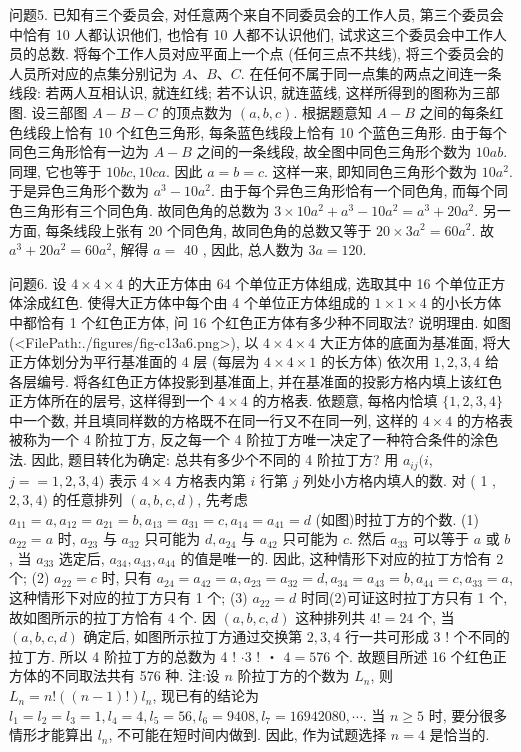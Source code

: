 问题5. 已知有三个委员会, 对任意两个来自不同委员会的工作人员, 第三个委员会中恰有 10 人都认识他们, 也恰有 10 人都不认识他们, 试求这三个委员会中工作人员的总数.
将每个工作人员对应平面上一个点 (任何三点不共线), 将三个委员会的人员所对应的点集分别记为 $A 、 B 、 C$. 在任何不属于同一点集的两点之间连一条线段: 若两人互相认识, 就连红线; 若不认识, 就连蓝线, 这样所得到的图称为三部图.
设三部图 $A-B-C$ 的顶点数为 $(a, b, c)$. 根据题意知 $A-B$ 之间的每条红色线段上恰有 10 个红色三角形, 每条蓝色线段上恰有 10 个蓝色三角形.
由于每个同色三角形恰有一边为 $A-B$ 之间的一条线段, 故全图中同色三角形个数为 $10 a b$. 同理, 它也等于 $10 b c, 10 c a$. 因此 $a=b=c$. 这样一来, 即知同色三角形个数为 $10 a^2$. 于是异色三角形个数为 $a^3-10 a^2$. 由于每个异色三角形恰有一个同色角, 而每个同色三角形有三个同色角.
故同色角的总数为 $3 \times 10 a^2+a^3-10 a^2=a^3+20 a^2$. 另一方面, 每条线段上张有 20 个同色角, 故同色角的总数又等于 $20 \times 3 a^2=60 a^2$. 故 $a^3+20 a^2=60 a^2$, 解得 $a=$ 40 , 因此, 总人数为 $3 a=120$.



问题6. 设 $4 \times 4 \times 4$ 的大正方体由 64 个单位正方体组成, 选取其中 16 个单位正方体涂成红色.
使得大正方体中每个由 4 个单位正方体组成的 $1 \times 1 \times 4$ 的小长方体中都恰有 1 个红色正方体, 问 16 个红色正方体有多少种不同取法? 说明理由.
如图(<FilePath:./figures/fig-c13a6.png>), 以 $4 \times 4 \times 4$ 大正方体的底面为基准面, 将大正方体划分为平行基准面的 4 层 (每层为 $4 \times 4 \times 1$ 的长方体) 依次用 $1,2,3,4$ 给各层编号.
将各红色正方体投影到基准面上, 并在基准面的投影方格内填上该红色正方体所在的层号, 这样得到一个 $4 \times 4$ 的方格表.
依题意, 每格内恰填 $\{1,2,3,4\}$ 中一个数, 并且填同样数的方格既不在同一行又不在同一列, 这样的 $4 \times 4$ 的方格表被称为一个 4 阶拉丁方, 反之每一个 4 阶拉丁方唯一决定了一种符合条件的涂色法.
因此, 题目转化为确定: 总共有多少个不同的 4 阶拉丁方? 用 $a_{i j}(i$, $j==1,2,3,4)$ 表示 $4 \times 4$ 方格表内第 $i$ 行第 $j$ 列处小方格内填人的数.
对 ( 1 , $2,3,4)$ 的任意排列 $(a, b, c, d)$, 先考虑 $a_{11}=a, a_{12}=a_{21}=b, a_{13}=a_{31}= c, a_{14}=a_{41}=d$ (如图)时拉丁方的个数.
(1) $a_{22}=a$ 时, $a_{23}$ 与 $a_{32}$ 只可能为 $d, a_{24}$ 与 $a_{42}$ 只可能为 $c$. 然后 $a_{33}$ 可以等于 $a$ 或 $b$, 当 $a_{33}$ 选定后, $a_{34}, a_{43}, a_{44}$ 的值是唯一的.
因此, 这种情形下对应的拉丁方恰有 2 个; (2) $a_{22}=c$ 时, 只有 $a_{24}= a_{42}=a, a_{23}=a_{32}=d, a_{34}=a_{43}=b, a_{44}=c, a_{33}=a$, 这种情形下对应的拉丁方只有 1 个; (3) $a_{22}=d$ 时同(2)可证这时拉丁方只有 1 个, 故如图所示的拉丁方恰有 4 个.
因 $(a, b, c, d)$ 这种排列共 $4 !=24$ 个, 当 $(a, b, c, d)$ 确定后, 如图所示拉丁方通过交换第 $2,3,4$ 行一共可形成 3 ! 个不同的拉丁方.
所以 4 阶拉丁方的总数为 4 ! $\cdot 3$ ! ・ $4=576$ 个.
故题目所述 16 个红色正方体的不同取法共有 576 种.
注:设 $n$ 阶拉丁方的个数为 $L_n$, 则 $L_n=n !((n-1) !) l_n$, 现已有的结论为 $l_1=l_2=l_3=1, l_4=4, l_5=56, l_6=9408, l_7=16942080, \cdots$. 当 $n \geqslant 5$ 时, 要分很多情形才能算出 $l_n$, 不可能在短时间内做到.
因此, 作为试题选择 $n=4$ 是恰当的.


